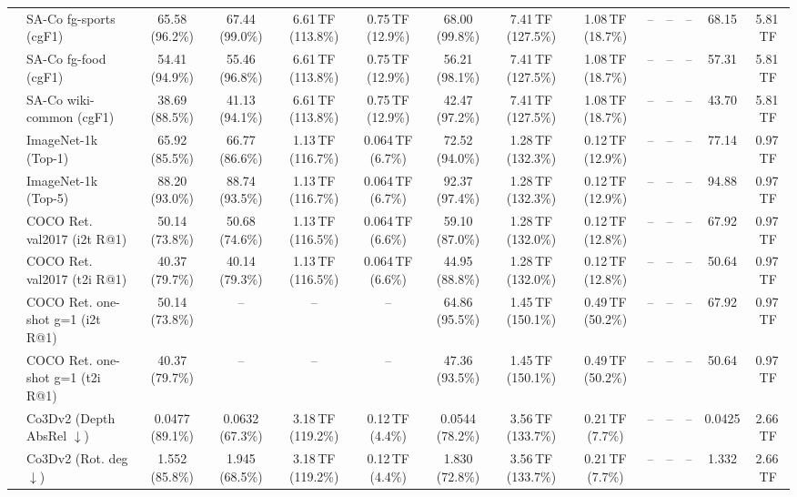 \begin{table}[t]
\begin{center}
\begin{small}
\begin{sc}
{\begin{tabular}{llcccccccccccc}
& SA-Co fg-sports (cgF1) & 65.58 (96.2\%) & 67.44 (99.0\%) & 6.61\,TF (113.8\%) & 0.75\,TF (12.9\%) & 68.00 (99.8\%) & 7.41\,TF (127.5\%) & 1.08\,TF (18.7\%) & -- & -- & -- & 68.15 & 5.81\,TF \\
& SA-Co fg-food (cgF1) & 54.41 (94.9\%) & 55.46 (96.8\%) & 6.61\,TF (113.8\%) & 0.75\,TF (12.9\%) & 56.21 (98.1\%) & 7.41\,TF (127.5\%) & 1.08\,TF (18.7\%) & -- & -- & -- & 57.31 & 5.81\,TF \\
& SA-Co wiki-common (cgF1) & 38.69 (88.5\%) & 41.13 (94.1\%) & 6.61\,TF (113.8\%) & 0.75\,TF (12.9\%) & 42.47 (97.2\%) & 7.41\,TF (127.5\%) & 1.08\,TF (18.7\%) & -- & -- & -- & 43.70 & 5.81\,TF \\
\midrule
{}
& ImageNet-1k (Top-1) & 65.92 (85.5\%) & 66.77 (86.6\%) & 1.13\,TF (116.7\%) & 0.064\,TF (6.7\%) & 72.52 (94.0\%) & 1.28\,TF (132.3\%) & 0.12\,TF (12.9\%) & -- & -- & -- & 77.14 & 0.97\,TF \\
& ImageNet-1k (Top-5) & 88.20 (93.0\%) & 88.74 (93.5\%) & 1.13\,TF (116.7\%) & 0.064\,TF (6.7\%) & 92.37 (97.4\%) & 1.28\,TF (132.3\%) & 0.12\,TF (12.9\%) & -- & -- & -- & 94.88 & 0.97\,TF \\
& COCO Ret. val2017 (i2t R@1) & 50.14 (73.8\%) & 50.68 (74.6\%) & 1.13\,TF (116.5\%) & 0.064\,TF (6.6\%) & 59.10 (87.0\%) & 1.28\,TF (132.0\%) & 0.12\,TF (12.8\%) & -- & -- & -- & 67.92 & 0.97\,TF \\
& COCO Ret. val2017 (t2i R@1) & 40.37 (79.7\%) & 40.14 (79.3\%) & 1.13\,TF (116.5\%) & 0.064\,TF (6.6\%) & 44.95 (88.8\%) & 1.28\,TF (132.0\%) & 0.12\,TF (12.8\%) & -- & -- & -- & 50.64 & 0.97\,TF \\
& COCO Ret. one-shot g=1 (i2t R@1) & 50.14 (73.8\%) & -- & -- & -- & 64.86 (95.5\%) & 1.45\,TF (150.1\%) & 0.49\,TF (50.2\%) & -- & -- & -- & 67.92 & 0.97\,TF \\
& COCO Ret. one-shot g=1 (t2i R@1) & 40.37 (79.7\%) & -- & -- & -- & 47.36 (93.5\%) & 1.45\,TF (150.1\%) & 0.49\,TF (50.2\%) & -- & -- & -- & 50.64 & 0.97\,TF \\
\midrule
{}
& Co3Dv2 (Depth AbsRel $\downarrow$) & 0.0477 (89.1\%) & 0.0632 (67.3\%) & 3.18\,TF (119.2\%) & 0.12\,TF (4.4\%) & 0.0544 (78.2\%) & 3.56\,TF (133.7\%) & 0.21\,TF (7.7\%) & -- & -- & -- & 0.0425 & 2.66\,TF \\
& Co3Dv2 (Rot. deg $\downarrow$) & 1.552 (85.8\%) & 1.945 (68.5\%) & 3.18\,TF (119.2\%) & 0.12\,TF (4.4\%) & 1.830 (72.8\%) & 3.56\,TF (133.7\%) & 0.21\,TF (7.7\%) & -- & -- & -- & 1.332 & 2.66\,TF \\

\end{tabular}}
\end{sc}
\end{small}
\end{center}
\end{table}
